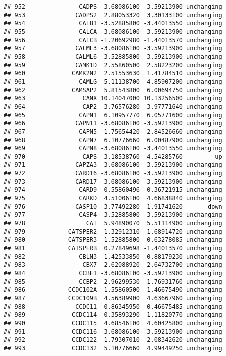 \documentclass[]{article}
\begin{document}
\begin{verbatim}
## 952               CADPS -3.68086100 -3.59213900 unchanging
## 953              CADPS2  2.88053320  3.30133100 unchanging
## 954               CALB1 -3.52885800 -3.44013550 unchanging
## 955               CALCA -3.68086100 -3.59213900 unchanging
## 956               CALCB -1.20692980 -1.44013570 unchanging
## 957              CALML3 -3.68086100 -3.59213900 unchanging
## 958              CALML6 -3.52885800 -3.59213900 unchanging
## 959              CAMK1D  2.55860500  2.58223200 unchanging
## 960             CAMK2N2  2.51553630  1.41784510 unchanging
## 961               CAMLG  5.11138700  4.85907200 unchanging
## 962             CAMSAP2  5.81543800  6.00694750 unchanging
## 963                CANX 10.14047000 10.13256500 unchanging
## 964                CAP2  3.76576280  3.97771640 unchanging
## 965               CAPN1  6.10957770  6.05771600 unchanging
## 966              CAPN11 -3.68086100 -3.59213900 unchanging
## 967               CAPN5  1.75654420  2.84526660 unchanging
## 968               CAPN7  6.10776660  6.00487900 unchanging
## 969               CAPN8 -3.68086100 -3.44013550 unchanging
## 970                CAPS  3.18538760  4.54285760         up
## 971              CAPZA3 -3.68086100 -3.59213900 unchanging
## 972              CARD16 -3.68086100 -3.59213900 unchanging
## 973              CARD17 -3.68086100 -3.59213900 unchanging
## 974               CARD9  0.55860496  0.36721915 unchanging
## 975               CARKD  4.51006100  4.66838840 unchanging
## 976              CASP10  3.77492280  1.91741620       down
## 977               CASP4 -3.52885800 -3.59213900 unchanging
## 978                 CAT  5.94890070  5.51114900 unchanging
## 979            CATSPER2  1.32912310  1.68914720 unchanging
## 980            CATSPER3 -1.52885800 -0.63278085 unchanging
## 981            CATSPERB  0.27849698 -1.44013570 unchanging
## 982               CBLN3  1.42533850  0.88179230 unchanging
## 983                CBX7  2.62088920  2.64732700 unchanging
## 984               CCBE1 -3.68086100 -3.59213900 unchanging
## 985               CCBP2  2.96299530  1.76931760 unchanging
## 986            CCDC102A  1.55860500  1.46675490 unchanging
## 987            CCDC109B  4.56389900  4.63667960 unchanging
## 988              CCDC11  0.86345950  0.46675485 unchanging
## 989             CCDC114 -0.35893290 -1.11820770 unchanging
## 990             CCDC115  4.68546100  4.60425800 unchanging
## 991             CCDC116 -3.68086100 -3.59213900 unchanging
## 992             CCDC122  1.79307010  2.08342620 unchanging
## 993             CCDC132  5.10776660  4.99449250 unchanging

\end{verbatim}
\end{document}
